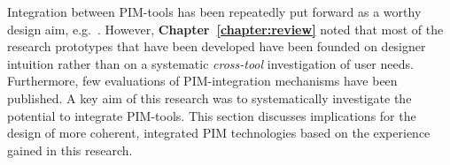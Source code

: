 Integration between PIM-tools has been repeatedly put forward as a worthy design aim, e.g.~\citep{Bellotti:03,Bergman:03,Kaptelinin:03}.  However, \textbf{Chapter~\ref{chapter:review}} noted that most of the research prototypes that have been developed have been founded on designer intuition rather than on a systematic \textit{cross-tool} investigation of user needs.  Furthermore, few evaluations of PIM-integration mechanisms have been published.
A key aim of this research was to systematically investigate the potential to integrate PIM-tools.  %
This section discusses implications for the design of more coherent, integrated PIM technologies based on the experience gained in this research.  %





